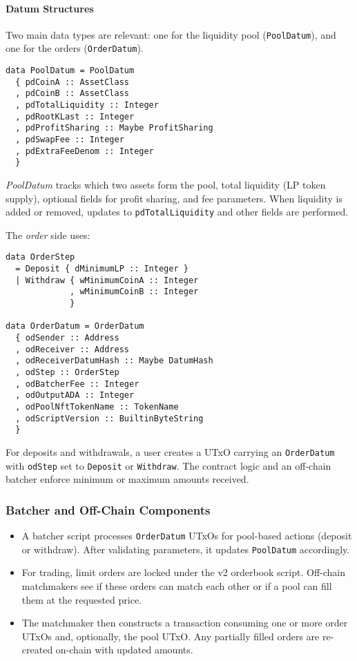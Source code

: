 \documentclass{article}
\begin{document}
\paragraph{Datum Structures}
Two main data types are relevant: one for the liquidity pool (\texttt{PoolDatum}), and one for the orders (\texttt{OrderDatum}).

\begin{verbatim}
data PoolDatum = PoolDatum
  { pdCoinA :: AssetClass
  , pdCoinB :: AssetClass
  , pdTotalLiquidity :: Integer
  , pdRootKLast :: Integer
  , pdProfitSharing :: Maybe ProfitSharing
  , pdSwapFee :: Integer
  , pdExtraFeeDenom :: Integer
  }
\end{verbatim}

\noindent
\emph{PoolDatum} tracks which two assets form the pool, total liquidity (LP token supply), optional fields for profit sharing, and fee parameters. When liquidity is added or removed, updates to \texttt{pdTotalLiquidity} and other fields are performed.

The \emph{order} side uses:

\begin{verbatim}
data OrderStep
  = Deposit { dMinimumLP :: Integer }
  | Withdraw { wMinimumCoinA :: Integer
             , wMinimumCoinB :: Integer
             }

data OrderDatum = OrderDatum
  { odSender :: Address
  , odReceiver :: Address
  , odReceiverDatumHash :: Maybe DatumHash
  , odStep :: OrderStep
  , odBatcherFee :: Integer
  , odOutputADA :: Integer
  , odPoolNftTokenName :: TokenName
  , odScriptVersion :: BuiltinByteString
  }
\end{verbatim}

\noindent
For deposits and withdrawals, a user creates a UTxO carrying an \texttt{OrderDatum} with \texttt{odStep} set to \texttt{Deposit} or \texttt{Withdraw}. The contract logic and an off-chain batcher enforce minimum or maximum amounts received.

\subsubsection{Batcher and Off-Chain Components}
\begin{itemize}
    \item A batcher script processes \texttt{OrderDatum} UTxOs for pool-based actions (deposit or withdraw). After validating parameters, it updates \texttt{PoolDatum} accordingly.
    \item For trading, limit orders are locked under the v2 orderbook script. Off-chain matchmakers see if these orders can match each other or if a pool can fill them at the requested price. 
    \item The matchmaker then constructs a transaction consuming one or more order UTxOs and, optionally, the pool UTxO. Any partially filled orders are re-created on-chain with updated amounts.
\end{itemize}
\end{document}

